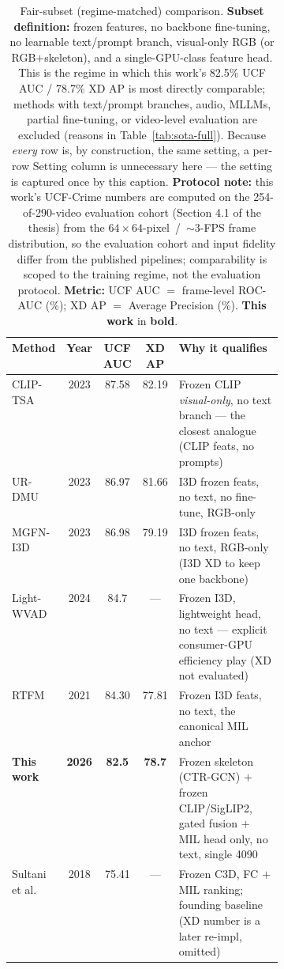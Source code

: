 \medskip

\begin{table}[t]
\centering
\caption{Fair-subset (regime-matched) comparison. \textbf{Subset definition:}
frozen features, no backbone fine-tuning, no learnable text/prompt branch,
visual-only RGB (or RGB$+$skeleton), and a single-GPU-class feature head. This
is the regime in which this work's 82.5\% UCF AUC / 78.7\% XD AP is most
directly comparable; methods with text/prompt branches, audio, MLLMs, partial
fine-tuning, or video-level evaluation are excluded (reasons in
Table~\ref{tab:sota-full}). Because \emph{every} row is, by construction, the
same setting, a per-row Setting column is unnecessary here --- the setting is
captured once by this caption. \textbf{Protocol note:} this work's UCF-Crime
numbers are computed on the 254-of-290-video evaluation cohort (Section 4.1 of
the thesis) from the $64\times64$-pixel~/~${\sim}3$-FPS frame distribution, so
the evaluation cohort and input fidelity differ from the published pipelines;
comparability is scoped to the training regime, not the evaluation protocol.
\textbf{Metric:} UCF AUC $=$ frame-level ROC-AUC
(\%); XD AP $=$ Average Precision (\%). \textbf{This work} in \textbf{bold}.}
\label{tab:sota-fair}
\small
\setlength{\tabcolsep}{5pt}
\begin{tabular}{l c c c p{0.40\linewidth}}
\toprule
Method & Year & UCF AUC & XD AP & Why it qualifies \\
\midrule
CLIP-TSA           & 2023 & 87.58 & 82.19 & Frozen CLIP \emph{visual-only}, no text branch --- the closest analogue (CLIP feats, no prompts) \\
UR-DMU             & 2023 & 86.97 & 81.66 & I3D frozen feats, no text, no fine-tune, RGB-only \\
MGFN-I3D           & 2023 & 86.98 & 79.19 & I3D frozen feats, no text, RGB-only (I3D XD to keep one backbone) \\
Light-WVAD         & 2024 & 84.7  & ---   & Frozen I3D, lightweight head, no text --- explicit consumer-GPU efficiency play (XD not evaluated) \\
RTFM               & 2021 & 84.30 & 77.81 & Frozen I3D feats, no text, the canonical MIL anchor \\
\textbf{This work} & \textbf{2026} & \textbf{82.5} & \textbf{78.7} & Frozen skeleton (CTR-GCN) $+$ frozen CLIP/SigLIP2, gated fusion $+$ MIL head only, no text, single 4090 \\
Sultani et al.     & 2018 & 75.41 & ---   & Frozen C3D, FC $+$ MIL ranking; founding baseline (XD number is a later re-impl, omitted) \\
\bottomrule
\end{tabular}


\end{table}
